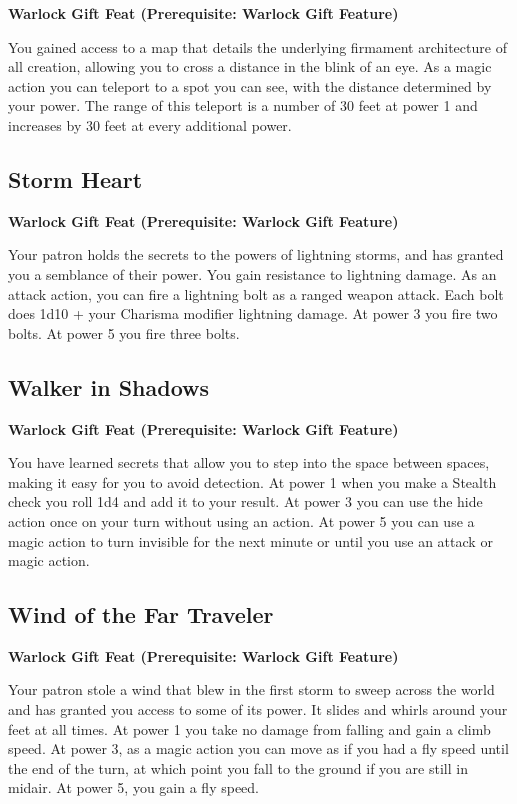 \documentclass[12pt,letterpaper,twocolumn,openany,nodeprecatedcode,bg=none]{dndbook}
\begin{document}
\textbf{Warlock Gift Feat (Prerequisite: Warlock Gift Feature)}

You gained access to a map that details the underlying firmament
architecture of all creation, allowing you to cross a distance in the
blink of an eye. As a magic action you can teleport to a spot you can
see, with the distance determined by your power. The range of this
teleport is a number of 30 feet at power 1 and increases by 30 feet at
every additional power.

\subsection{Storm Heart}\label{storm-heart}

\textbf{Warlock Gift Feat (Prerequisite: Warlock Gift Feature)}

Your patron holds the secrets to the powers of lightning storms, and has
granted you a semblance of their power. You gain resistance to lightning
damage. As an attack action, you can fire a lightning bolt as a ranged
weapon attack. Each bolt does 1d10 + your Charisma modifier lightning
damage. At power 3 you fire two bolts. At power 5 you fire three bolts.

\subsection{Walker in Shadows}\label{walker-in-shadows}

\textbf{Warlock Gift Feat (Prerequisite: Warlock Gift Feature)}

You have learned secrets that allow you to step into the space between
spaces, making it easy for you to avoid detection. At power 1 when you
make a Stealth check you roll 1d4 and add it to your result. At power 3
you can use the hide action once on your turn without using an action.
At power 5 you can use a magic action to turn invisible for the next
minute or until you use an attack or magic action.

\subsection{Wind of the Far Traveler}\label{wind-of-the-far-traveler}

\textbf{Warlock Gift Feat (Prerequisite: Warlock Gift Feature)}

Your patron stole a wind that blew in the first storm to sweep across
the world and has granted you access to some of its power. It slides and
whirls around your feet at all times. At power 1 you take no damage from
falling and gain a climb speed. At power 3, as a magic action you can
move as if you had a fly speed until the end of the turn, at which point
you fall to the ground if you are still in midair. At power 5, you gain
a fly speed.
\end{document}
